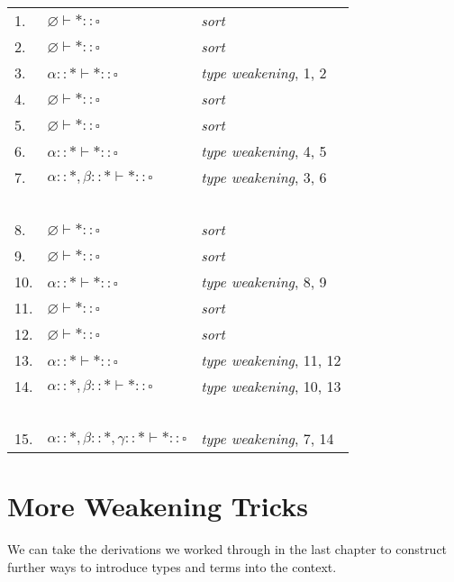 \documentclass{book}
\numberwithin{equation}{chapter}
\begin{document}
\begin{center}
\begin{tabular}[t]{l l l}
1. & $\varnothing \vdash \ast :: \square$ & \textit{sort} \\
2. & $\varnothing \vdash \ast :: \square$ & \textit{sort} \\
3. & $\alpha :: \ast \vdash \ast :: \square$ & \textit{type weakening}, 1, 2 \\
4. & $\varnothing \vdash \ast :: \square$ & \textit{sort} \\
5. & $\varnothing \vdash \ast :: \square$ & \textit{sort} \\
6. & $\alpha :: \ast \vdash \ast :: \square$ & \textit{type weakening}, 4, 5 \\
7. & $\alpha :: \ast, \beta :: \ast \vdash \ast :: \square$ & \textit{type weakening}, 3, 6 \\
~ & ~ & \\
8. & $\varnothing \vdash \ast :: \square$ & \textit{sort} \\
9. & $\varnothing \vdash \ast :: \square$ & \textit{sort} \\
10. & $\alpha :: \ast \vdash \ast :: \square$ & \textit{type weakening}, 8, 9 \\
11. & $\varnothing \vdash \ast :: \square$ & \textit{sort} \\
12. & $\varnothing \vdash \ast :: \square$ & \textit{sort} \\
13. & $\alpha :: \ast \vdash \ast :: \square$ & \textit{type weakening}, 11, 12 \\
14. & $\alpha :: \ast, \beta :: \ast \vdash \ast :: \square$ & \textit{type weakening}, 10, 13 \\
~ & ~ & \\
15. & $\alpha :: \ast, \beta :: \ast, \gamma :: \ast \vdash \ast :: \square$ & \textit{type weakening}, 7, 14
\end{tabular}
\end{center}


\chapter{More Weakening Tricks}

We can take the derivations we worked through in the last chapter to construct further ways to introduce types and terms into the context.
\end{document}
